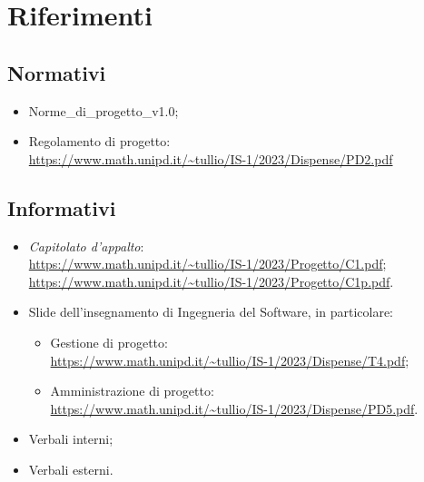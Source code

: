 \section{Riferimenti}
    \subsection{Normativi}
        \begin{itemize}
            \item Norme\_di\_progetto\_v1.0;
            \item Regolamento di progetto:\\
                \url{https://www.math.unipd.it/~tullio/IS-1/2023/Dispense/PD2.pdf}
    \end{itemize}
    \subsection{Informativi}
    \begin{itemize}
            \item \textit{Capitolato d'appalto}:\\
                    \url{https://www.math.unipd.it/~tullio/IS-1/2023/Progetto/C1.pdf};\\
                    \url{https://www.math.unipd.it/~tullio/IS-1/2023/Progetto/C1p.pdf}.
            \item Slide dell'insegnamento di Ingegneria del Software, in particolare:
            \begin{itemize}
                \item Gestione di progetto:\\
                \url{https://www.math.unipd.it/~tullio/IS-1/2023/Dispense/T4.pdf};
                \item Amministrazione di progetto:\\
                \url{https://www.math.unipd.it/~tullio/IS-1/2023/Dispense/PD5.pdf}.
            \end{itemize}
            \item Verbali interni;
            \item Verbali esterni.
    \end{itemize}

    \newpage